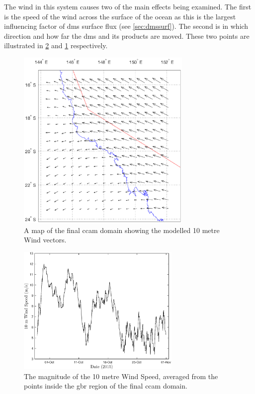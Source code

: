 The wind in this system causes two of the main effects being examined. The first is the speed of the wind across the surface of the ocean as this is the largest influencing factor of \gls{dms} surface flux (see \cref{sec:dmssurf}). The second is in which direction and how far the \gls{dms} and its products are moved. These two points are illustrated in \cref{fig:magwind} and \cref{fig:windmap} respectively.

\begin{figure}[!hbt]
    \centering
    \includegraphics[width=0.75\textwidth]{Fig/Research/CCAM/WindSpeedMapAvgOverTime.eps}
    \vspace{-1cm}
    \caption{ A map of the final \gls{ccam} domain showing the modelled 10 metre Wind vectors. }
    \label{fig:windmap}
\end{figure}

\begin{figure}[!hbt]
    \centering
    \includegraphics[width=0.70\textwidth]{Fig/Research/CCAM/GBRAveragedPlot_u10.eps}
    \caption{ The magnitude of the 10 metre Wind Speed, averaged from the points inside the \gls{gbr} region of the final \gls{ccam} domain. }
    \label{fig:magwind}
\end{figure}

